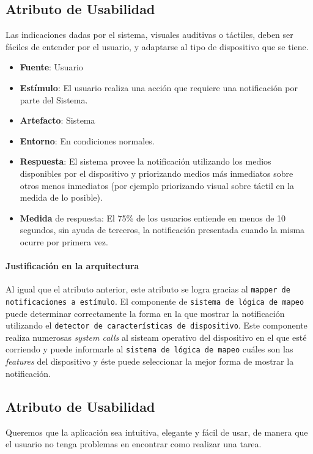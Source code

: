 \subsection{Atributo de Usabilidad}
Las indicaciones dadas por el sistema, visuales auditivas o táctiles, deben ser fáciles de entender por el usuario, y adaptarse al tipo de dispositivo que se tiene.

\begin{itemize}
  \item \textbf{Fuente}: Usuario
  \item \textbf{Estímulo}: El usuario realiza una acción que requiere una notificación por parte del Sistema.
  \item \textbf{Artefacto}: Sistema
  \item \textbf{Entorno}: En condiciones normales.
  \item \textbf{Respuesta}: El sistema provee la notificación utilizando los medios disponibles por el dispositivo y priorizando medios más inmediatos sobre otros menos inmediatos (por ejemplo priorizando visual sobre táctil en la medida de lo posible).
  \item \textbf{Medida} de respuesta: El 75\% de los usuarios entiende en menos de 10 segundos, sin ayuda de terceros, la notificación presentada cuando la misma ocurre por primera vez.
\end{itemize}

\paragraph{Justificación en la arquitectura}
Al igual que el atributo anterior, este atributo se logra gracias al \texttt{mapper de notificaciones a estímulo}. El componente de \texttt{sistema de lógica de mapeo} puede determinar correctamente la forma en la que mostrar la notificación utilizando el \texttt{detector de características de dispositivo}. Este componente realiza numerosas \emph{system calls} al sisteam operativo del dispositivo en el que esté corriendo y puede informarle al \texttt{sistema de lógica de mapeo} cuáles son las \emph{features} del dispositivo y éste puede seleccionar la mejor forma de mostrar la notificación. 


\subsection{Atributo de Usabilidad}
Queremos que la aplicación sea intuitiva, elegante y fácil de usar, de manera que el usuario no tenga problemas en encontrar como realizar una tarea.

